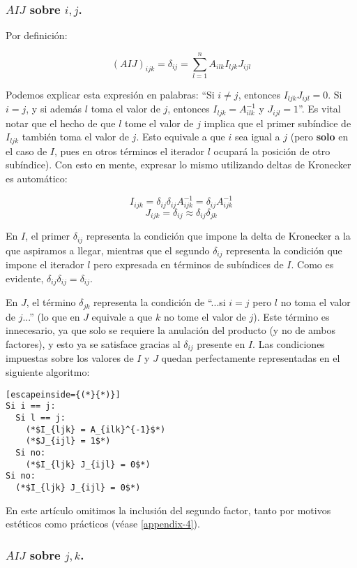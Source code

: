\subsubsection{$AIJ$ sobre $i, j$.}

Por definición:

$$(AIJ)_{ijk} = \delta_{ij} = \sum\limits^{n}_{l = 1} A_{ilk} I_{ljk} J_{ijl}$$

Podemos explicar esta expresión en palabras: ``Si $i \neq j$, entonces $I_{ljk} J_{ijl} = 0$. Si $i = j$, y si además $l$ toma el valor de $j$, entonces $I_{ljk} = A^{-1}_{ilk}$ y $J_{ijl} = 1$''. Es vital notar que el hecho de que $l$ tome el valor de $j$ implica que el primer subíndice de $I_{ljk}$ también toma el valor de $j$. Esto equivale a que $i$ sea igual a $j$ (pero \textbf{solo} en el caso de $I$, pues en otros términos el iterador $l$ ocupará la posición de otro subíndice). Con esto en mente, expresar lo mismo utilizando deltas de Kronecker es automático:

$$I_{ijk} = \delta_{ij} \delta_{ij} A_{ijk}^{-1} = \delta_{ij} A_{ijk}^{-1}$$
$$J_{ijk} = \delta_{ij} \approx \delta_{ij} \delta_{jk}$$

En $I$, el primer $\delta_{ij}$ representa la condición que impone la delta de Kronecker a la que aspiramos a llegar, mientras que el segundo $\delta_{ij}$ representa la condición que impone el iterador $l$ pero expresada en términos de subíndices de $I$. Como es evidente, $\delta_{ij} \delta_{ij} = \delta_{ij}$.

En $J$, el término $\delta_{jk}$ representa la condición de ``...si $i = j$ pero $l$ no toma el valor de $j$...'' (lo que en $J$ equivale a que $k$ no tome el valor de $j$). Este término es innecesario, ya que solo se requiere la anulación del producto (y no de ambos factores), y esto ya se satisface gracias al $\delta_{ij}$ presente en $I$. Las condiciones impuestas sobre los valores de $I$ y $J$ quedan perfectamente representadas en el siguiente algoritmo:

\begin{lstlisting}[escapeinside={(*}{*)}]
Si i == j:
  Si l == j:
    (*$I_{ljk} = A_{ilk}^{-1}$*)
    (*$J_{ijl} = 1$*)
  Si no:
    (*$I_{ljk} J_{ijl} = 0$*)
Si no:
  (*$I_{ljk} J_{ijl} = 0$*)	
\end{lstlisting}

En este artículo omitimos la inclusión del segundo factor, tanto por motivos estéticos como prácticos (véase \ref{appendix-4}).

\subsubsection{$AIJ$ sobre $j, k$.}

